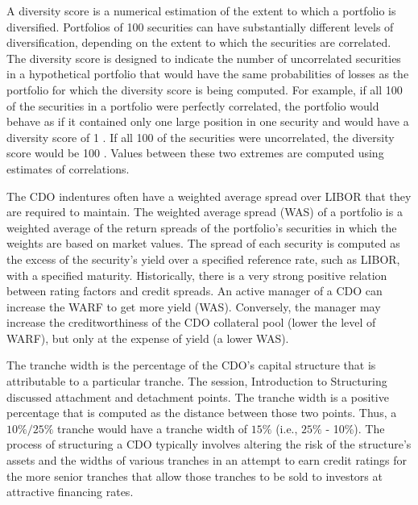 \documentclass[11pt]{article}
\begin{document}
A diversity score is a numerical estimation of the extent to which a portfolio is diversified. Portfolios of 100 securities can have substantially different levels of diversification, depending on the extent to which the securities are correlated. The diversity score is designed to indicate the number of uncorrelated securities in a hypothetical portfolio that would have the same probabilities of losses as the portfolio for which the diversity score is being computed. For example, if all 100 of the securities in a portfolio were perfectly correlated, the portfolio would behave as if it contained only one large position in one security and would have a diversity score of 1 . If all 100 of the securities were uncorrelated, the diversity score would be 100 . Values between these two extremes are computed using estimates of correlations.

The CDO indentures often have a weighted average spread over LIBOR that they are required to maintain. The weighted average spread (WAS) of a portfolio is a weighted average of the return spreads of the portfolio's securities in which the weights are based on market values. The spread of each security is computed as the excess of the security's yield over a specified reference rate, such as LIBOR, with a specified maturity. Historically, there is a very strong positive relation between rating factors and credit spreads. An active manager of a CDO can increase the WARF to get more yield (WAS). Conversely, the manager may increase the creditworthiness of the CDO collateral pool (lower the level of WARF), but only at the expense of yield (a lower WAS).

The tranche width is the percentage of the CDO's capital structure that is attributable to a particular tranche. The session, Introduction to Structuring discussed attachment and detachment points. The tranche width is a positive percentage that is computed as the distance between those two points. Thus, a $10 \% / 25 \%$ tranche would have a tranche width of $15 \%$ (i.e., $25 \%$ - 10\%). The process of structuring a CDO typically involves altering the risk of the structure's assets and the widths of various tranches in an attempt to earn credit ratings for the more senior tranches that allow those tranches to be sold to investors at attractive financing rates.
\end{document}
